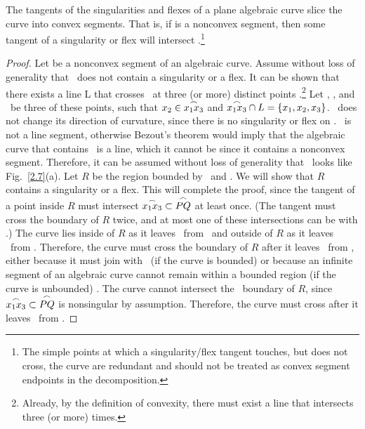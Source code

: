 \begin{theorem}
\label{deke}
The tangents of the singularities and flexes of a plane algebraic curve slice
the curve into convex segments.  That is, if  is a nonconvex 
segment, then some tangent of a singularity or flex will intersect 
.\footnote{The simple points at which a singularity/flex 
	tangent touches, but does not cross, the curve are redundant and should 
	not be treated as convex segment endpoints in the decomposition.}
\end{theorem}
%
%
\begin{proof}
Let  be a nonconvex segment of an algebraic curve.
Assume without loss of generality that \pq\ does not contain a singularity or 
a flex.
It can be shown that there exists a line L that crosses \pq\ at three 
(or more) distinct points \cite[p. 117]{jj}.\footnote{Already, by the definition
	of convexity, there must exist a line that intersects  three
	(or more) times.}
Let \xo, \xt, and \xth\ be three of these points, such that $\mbox{$x_{2}$} \in \mbox{$\stackrel{\frown}{\mbox{$x_{1}$}\mbox{$x_{3}$}}$}$ 
and \mbox{$\mbox{$\stackrel{\frown}{\mbox{$x_{1}$}\mbox{$x_{3}$}}$} \cap L = \{ \mbox{$x_{1}$},\mbox{$x_{2}$},\mbox{$x_{3}$}\}$}.
\xotha\ does not change its direction of curvature, since there is no 
singularity or flex on \pq.
\xotha\ is not a line segment, otherwise Bezout's theorem would imply that
the algebraic curve that contains \xotha\ is a line, which it cannot be since
it contains a nonconvex segment.
Therefore, it can be assumed without loss of generality that \xotha\ looks like 
Fig.~\ref{2.7}(a).
Let $R$ be the region bounded by \xotha\ and \seg{\xo\xth}.
We will show that $R$ contains a singularity or a flex.
This will complete the proof, since the tangent
of a point inside $R$ must intersect $\mbox{$\stackrel{\frown}{\mbox{$x_{1}$}\mbox{$x_{3}$}}$} \subset \mbox{$\stackrel{\frown}{PQ}$}$ at least once.
(The tangent must cross the boundary of $R$ twice, and at most one of these
intersections can be with 
\seg{\xo\xth}.)
The curve lies inside of $R$ as it leaves \xotha\ from \xo\ and outside 
of $R$ as it leaves \xotha\ from \xth.
Therefore, the curve must cross the boundary of $R$ after it leaves \xotha\
from \xo, either because it must join with \xth\ (if the curve is bounded)
or because an infinite segment of an algebraic curve
cannot remain within a bounded region (if the curve is unbounded) \cite[p. 116]{jj}.
The curve cannot intersect the \xotha\ boundary of $R$, since
\mbox{$\mbox{$\stackrel{\frown}{\mbox{$x_{1}$}\mbox{$x_{3}$}}$} \subset \mbox{$\stackrel{\frown}{PQ}$}$} is nonsingular by assumption.
Therefore, the curve must cross \seg{\xo\xth} after it leaves
\xotha\ from \xo.


\end{proof}
